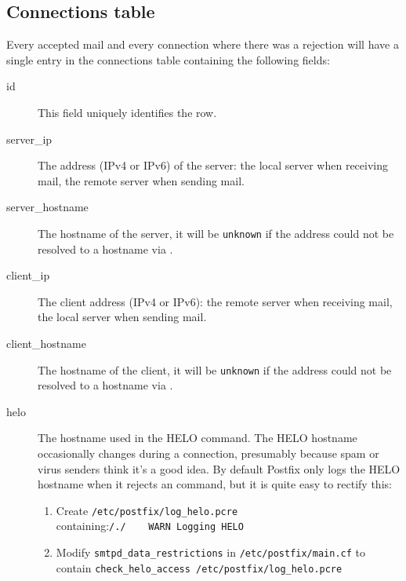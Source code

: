 \subsection{Connections table}

\label{connections table}

Every accepted mail and every connection where there was a rejection will
have a single entry in the connections table containing the following
fields:

\begin{description}

    \item [id] This field uniquely identifies the row.

    \item [server\_ip] The \IP{} address (IPv4 or IPv6) of the server: the
        local server when receiving mail, the remote server when sending
        mail.

    \item [server\_hostname] The hostname of the server, it will be
        \texttt{unknown} if the \IP{} address could not be resolved to a
        hostname via \DNS{}\@.

    \item [client\_ip] The client \IP{} address (IPv4 or IPv6): the remote
        server when receiving mail, the local server when sending mail.

    \item [client\_hostname] The hostname of the client, it will be
        \texttt{unknown} if the \IP{} address could not be resolved to a
        hostname via \DNS{}\@.

    \item [helo] The hostname used in the HELO command.  The HELO hostname
        occasionally changes during a connection, presumably because spam
        or virus senders think it's a good idea.  By default Postfix only
        logs the HELO hostname when it rejects an \SMTP{} command, but it
        is quite easy to rectify this:

\label{logging helo}

        \begin{enumerate}

            \item Create \texttt{/etc/postfix/log\_helo.pcre}
                containing:\newline \tab{}\texttt{/./~~~~WARN~Logging~HELO}

            \item Modify \texttt{smtpd\_data\_restrictions} in
                \texttt{/etc/postfix/main.cf} to contain\newline
                \tab{}\texttt{check\_helo\_access~/etc/postfix/log\_helo.pcre}


\end{enumerate}
\end{description}
